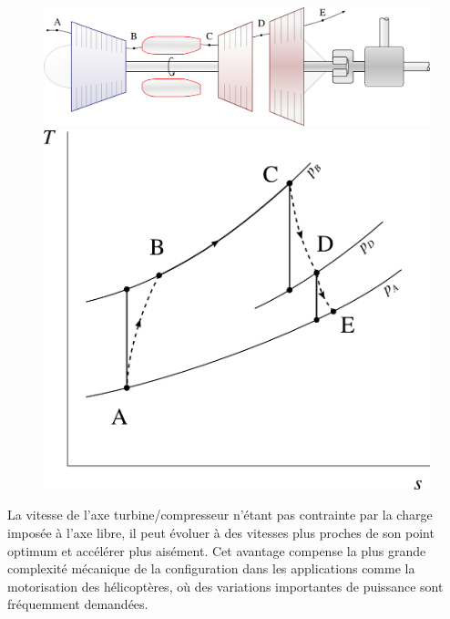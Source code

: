 		\begin{figure}
			\begin{center}
				\includegraphics[scale=0.6]{images/circuit_turbine_libre.png}\vspace{0.5cm}
				\includegraphics[scale=0.8]{images/ts_gp_turbine_libre.png}
			\end{center}
			\label{fig_turbine_libre}
		\end{figure}

		La vitesse de l’axe turbine/compresseur n’étant pas contrainte par la charge imposée à l’axe libre, il peut évoluer à des vitesses plus proches de son point optimum et accélérer plus aisément. Cet avantage compense la plus grande complexité mécanique de la configuration dans les applications comme la motorisation des hélicoptères, où des variations importantes de puissance sont fréquemment demandées.

